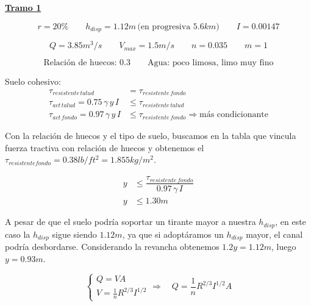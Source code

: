 \underline{\bf Tramo 1}


\begin{equation*}
  r = 20\%
 \qquad
  h_{disp} = 1.12 m \,\text{(en progresiva }5.6 km \text{)}
 \qquad
  I = 0.00147
\end{equation*}

\begin{equation*}
  Q = 3.85 m^3/s
 \qquad
  V_{max} = 1.5 m/s
 \qquad
  n = 0.035
 \qquad
  m = 1
\end{equation*}

\begin{equation*}
  \text{Relación de huecos: 0.3}
  \qquad
  \text{Agua: poco limosa, limo muy fino}
\end{equation*}

Suelo cohesivo:
\begin{align*}
 \tau_{resistente\,talud} &= \tau_{resistente\,fondo} \\
 \tau_{act\,talud} = 0.75 \, \gamma \, y \, I &\leq \tau_{resistente\,talud} \\
 \tau_{act\,fondo} = 0.97 \, \gamma \, y \, I &\leq \tau_{resistente\,fondo} \Longrightarrow \text{más condicionante}
\end{align*}

Con la relación de huecos y el tipo de suelo, buscamos en la tabla que vincula fuerza tractiva con relación de huecos y obtenemos
el $\tau_{resistente fondo} = 0.38 lb/ ft^2 = 1.855 kg/m^2$.

\begin{align*}
 y &\leq \dfrac{\tau_{resistente\,fondo}}{0.97 \, \gamma \, I} \\
 y &\leq 1.30 m
\end{align*}

A pesar de que el suelo podría soportar un tirante mayor a nuestra $h_{disp}$, en este caso la $h_{disp}$ sigue siendo $1.12 m$, ya que si adoptáramos 
un $h_{disp}$ mayor, el canal podría desbordarse.
Considerando la revancha obtenemos $1.2 y = 1.12 m$, luego $y = 0.93 m$.


\begin{equation*}
  \begin{cases}
    Q = V A \\
    V =  \frac{1}{n} R^{2/3} I^{1/2}
  \end{cases}
  \Longrightarrow \quad
  Q = \frac{1}{n} R^{2/3} I^{1/2} A
\end{equation*}


